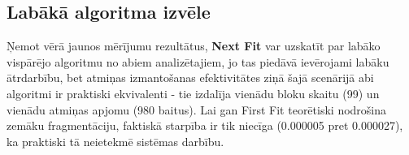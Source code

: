 \documentclass{report}
\begin{document}
	\subsection{Labākā algoritma izvēle}
	
	Ņemot vērā jaunos mērījumu rezultātus, \textbf{Next Fit} var uzskatīt par labāko vispārējo algoritmu no abiem analizētajiem, jo tas piedāvā ievērojami labāku ātrdarbību, bet atmiņas izmantošanas efektivitātes ziņā šajā scenārijā abi algoritmi ir praktiski ekvivalenti - tie izdalīja vienādu bloku skaitu (99) un vienādu atmiņas apjomu (980 baitus). Lai gan First Fit teorētiski nodrošina zemāku fragmentāciju, faktiskā starpība ir tik niecīga (0.000005 pret 0.000027), ka praktiski tā neietekmē sistēmas darbību.
	
\end{document}
